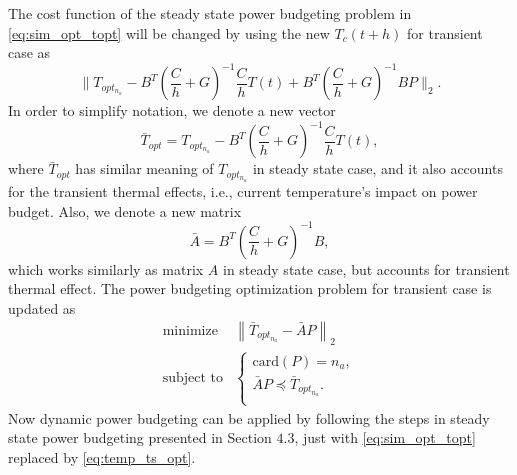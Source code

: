 The cost function of the steady state power budgeting problem in
\eqref{eq:sim_opt_topt} will be changed by using the new $T_c(t+h)$ for
transient case as
\begin{equation}\label{eq:cost_trans}
\|T_{opt_{n_{a}}} -  B^{T}(\frac{C}{h}+G)^{-1}\frac{C}{h}T(t)+B^{T}(\frac{C}{h}+G)^{-1}BP\|_2.
\end{equation}
In order to simplify notation, we denote a new vector  
\begin{equation}
\bar{T}_{opt}=T_{opt_{n_{a}}} - B^{T}(\frac{C}{h}+G)^{-1}\frac{C}{h}T(t),
\end{equation}
where $\bar{T}_{opt}$ has similar meaning of
$T_{opt_{n_{a}}}$ in steady state case, and it also accounts for the transient
thermal effects, i.e., current temperature's impact on power
budget. Also, we denote a new matrix 
\begin{equation}
\bar{A} = B^{T}(\frac{C}{h}+G)^{-1}B, 
\end{equation}
which works similarly as matrix $A$ in steady
state case, but accounts for transient thermal effect. The power
budgeting optimization problem for transient case is updated as 
\begin{equation}\label{eq:temp_ts_opt}
\begin{split}
\text{minimize } &  \left \| \bar{T}_{opt_{n_{a}}}-\bar{A}P \right \|_{2}\\
\text{subject to} &\left\{
\begin{array}{lr}
\text{card}(P) = n_{a},\\
\bar{A}P \preceq \bar{T}_{opt_{n_{a}}}.\\
\end{array}
\right.
\end{split}
\end{equation}
Now dynamic power budgeting can be
applied by following the steps in steady state power budgeting presented in
Section $4.3$, just with \eqref{eq:sim_opt_topt} replaced
by \eqref{eq:temp_ts_opt}.


